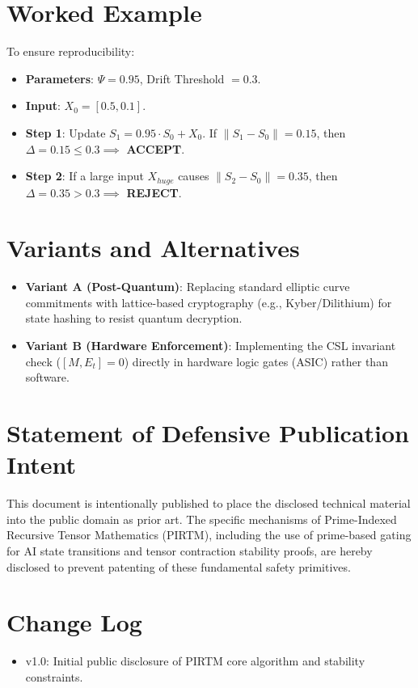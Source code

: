 \documentclass[11pt, a4paper]{article}
\begin{document}
\section{Worked Example}
To ensure reproducibility:
\begin{itemize}
    \item \textbf{Parameters}: $\Psi = 0.95$, Drift Threshold $= 0.3$.
    \item \textbf{Input}: $X_0 = [0.5, 0.1]$.
    \item \textbf{Step 1}: Update $S_1 = 0.95 \cdot S_0 + X_0$. If $\|S_1 - S_0\| = 0.15$, then $\Delta = 0.15 \le 0.3 \implies$ \textbf{ACCEPT}.
    \item \textbf{Step 2}: If a large input $X_{huge}$ causes $\|S_2 - S_0\| = 0.35$, then $\Delta = 0.35 > 0.3 \implies$ \textbf{REJECT}.
\end{itemize}

\section{Variants and Alternatives}
\begin{itemize}
    \item \textbf{Variant A (Post-Quantum)}: Replacing standard elliptic curve commitments with lattice-based cryptography (e.g., Kyber/Dilithium) for state hashing to resist quantum decryption.
    \item \textbf{Variant B (Hardware Enforcement)}: Implementing the CSL invariant check ($[M, E_t] = 0$) directly in hardware logic gates (ASIC) rather than software.
\end{itemize}

\section{Statement of Defensive Publication Intent}
This document is intentionally published to place the disclosed technical material into the public domain as prior art. The specific mechanisms of Prime-Indexed Recursive Tensor Mathematics (PIRTM), including the use of prime-based gating for AI state transitions and tensor contraction stability proofs, are hereby disclosed to prevent patenting of these fundamental safety primitives.

\section{Change Log}
\begin{itemize}
    \item v1.0: Initial public disclosure of PIRTM core algorithm and stability constraints.
\end{itemize}
\end{document}
